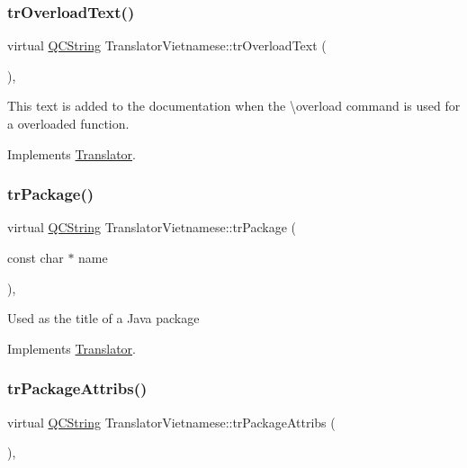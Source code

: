\subsubsection{\texorpdfstring{trOverloadText()}{trOverloadText()}}
{\footnotesize\ttfamily virtual \mbox{\hyperlink{class_q_c_string}{Q\+C\+String}} Translator\+Vietnamese\+::tr\+Overload\+Text (\begin{DoxyParamCaption}{ }\end{DoxyParamCaption})\hspace{0.3cm}{\ttfamily [inline]}, {\ttfamily [virtual]}}

This text is added to the documentation when the \textbackslash{}overload command is used for a overloaded function. 

Implements \mbox{\hyperlink{class_translator}{Translator}}.

\mbox{\label{class_translator_vietnamese_ab8912e31b622a811f57e297e576b4076}} 
\subsubsection{\texorpdfstring{trPackage()}{trPackage()}}
{\footnotesize\ttfamily virtual \mbox{\hyperlink{class_q_c_string}{Q\+C\+String}} Translator\+Vietnamese\+::tr\+Package (\begin{DoxyParamCaption}\item[{const char $\ast$}]{name }\end{DoxyParamCaption})\hspace{0.3cm}{\ttfamily [inline]}, {\ttfamily [virtual]}}

Used as the title of a Java package 

Implements \mbox{\hyperlink{class_translator}{Translator}}.

\mbox{\label{class_translator_vietnamese_acbccbeae7500f1153d832267107be077}} 
\subsubsection{\texorpdfstring{trPackageAttribs()}{trPackageAttribs()}}
{\footnotesize\ttfamily virtual \mbox{\hyperlink{class_q_c_string}{Q\+C\+String}} Translator\+Vietnamese\+::tr\+Package\+Attribs (\begin{DoxyParamCaption}{ }\end{DoxyParamCaption})\hspace{0.3cm}{\ttfamily [inline]}, {\ttfamily [virtual]}}

